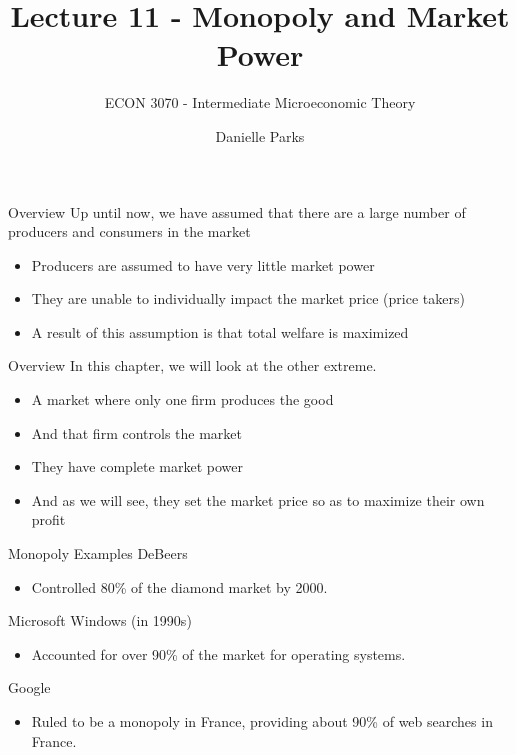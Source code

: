 \documentclass{beamer}
\author{Danielle Parks}
\title{Lecture 11 - Monopoly and Market Power}
\subtitle{ECON 3070 - Intermediate Microeconomic Theory}
\begin{document}
\begin{frame}
  \titlepage
\end{frame}

\begin{frame}{Overview}
  Up until now, we have assumed that there are a large number of producers and consumers in the market

  \begin{itemize}
    \item Producers are assumed to have very little market power
    
    \item They are unable to individually impact the market price (price takers)
     
    \item A result of this assumption is that total welfare is maximized
  \end{itemize}
\end{frame}


\begin{frame}{Overview}
  In this chapter, we will look at the other extreme.

  \begin{itemize}
    \item A market where only one firm produces the good
    \item And that firm controls the market
    \item They have complete market power
    \item And as we will see, they set the market price so as to maximize their own profit
  \end{itemize}
\end{frame}

\begin{frame}{Monopoly Examples}
  DeBeers 
  \begin{itemize}
    \item Controlled 80\% of the diamond market by 2000.
  \end{itemize}

  \bigskip
  Microsoft Windows (in 1990s)
  \begin{itemize}
    \item Accounted for over 90\% of the market for operating systems.
  \end{itemize}

  \bigskip
  Google
  \begin{itemize}
    \item Ruled to be a monopoly in France, providing about 90\% of web searches in France.
  \end{itemize}
\end{frame}
\end{document}
